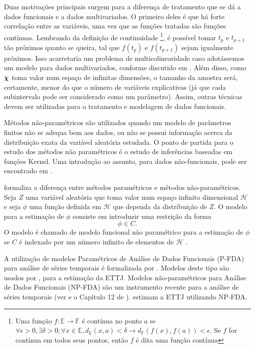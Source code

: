 \documentclass[
	12pt,				%
	openright,			%
	oneside,			%
	a4paper,			%
	english,			%
	brazil				%
	]{dissertacao-ufrgs-abntex2}
\begin{document}
Duas motivações principais surgem para a diferença de tratamento que se dá a dados
funcionais e a dados multivariados. O primeiro deles é que há forte
correlação entre as variáveis, uma vez que as funções tratadas são
funções contínuas. Lembrando da definição de continuidade%
\footnote{Uma função $f:\mathbb{E\rightarrow\mathbb{F}}$ é contínua no ponto
$a$ se $\forall\epsilon>0,\exists\delta>0;\forall x\in\mathbb{E},d_{\mathbb{E}}(x,a)<\delta\rightarrow d_{\mathbb{F}}(f(x),f(a))<\epsilon$.
Se $f$ for contínua em todos seus pontos, então $f$ é dita uma função
contínua%
}, é possível tomar $t_{p}$ e $t_{p+1}$ tão próximos quanto se queira,
tal que $f(t_{p})$ e $f(t_{p+1})$ sejam igualmente próximos. Isso
acarretaria um problema de multicolinearidade caso adotássemos um
modelo para dados multivariados, conforme discutido em . Além disso, como $\boldsymbol{\chi}$ toma valor num espaço de infinitas dimensões, o tamanho da amostra será, certamente, menor do que o número de variáveis explicativas (já que cada subintervalo pode ser considerado como um parâmetro). Assim, outras
técnicas devem ser utilizadas para o tratamento e modelagem de dados
funcionais.

Métodos não-paramétricos são utilizados quando um modelo de parâmetros
finitos não se adequa bem aos dados, ou não se possui informação acerca
da distribuição exata da variável aleatória estudada. O ponto de partida
para o estudo dos métodos não paramétricos é o estudo de inferências
baseadas em funções Kernel. Uma introdução ao assunto, para dados não-funcionais, pode ser encontrado 
em .

 formaliza a diferença entre métodos paramétricos e métodos não-paramétricos.
Seja $Z$ uma variável aleatória que toma valor num espaço infinito
dimensional $\mathcal{H}$ e seja $\phi$ uma função definida em $\mathcal{H}$
que dependa da distribuição de $Z$. O modelo para a estimação de
$\phi$ consiste em introduzir uma restrição da forma
\[
\phi\in C.
\]
O modelo é chamado de modelo funcional não paramétrico para a estimação
de $\phi$ se $C$ é indexado por um número infinito de elementos
de $\mathcal{H}$ .

A utilização de modelos Paramétricos de Análise de Dados Funcionais
(P-FDA) para análise de séries temporais
é formalizada por  .
Modelos deste tipo são usados por ,
 para a estimação da ETTJ.
Modelos não-paramétricos para Análise de Dados Funcionais (NP-FDA) são um instrumento recente para a análise
de séries temporais (ver  e o Capítulo 12 de ).
 estimam a ETTJ utilizando
NP-FDA. %
\end{document}
